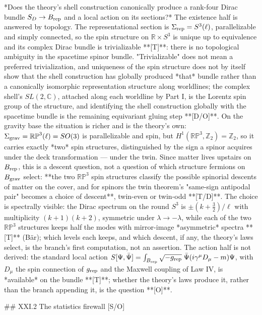 *Does the theory's shell construction canonically produce a rank-four Dirac bundle $S_D\to B_{\rm rep}$ and a local action on its sections?* The existence half is answered by topology. The representational section is $\Sigma_{\rm rep} = S^3(\ell)$, parallelizable and simply connected, so the spin structure on $\mathbb R\times S^3$ is unique up to equivalence and its complex Dirac bundle is trivializable **[T]**: there is no topological ambiguity in the spacetime spinor bundle. "Trivializable" does not mean a preferred trivialization, and uniqueness of the spin structure does not by itself show that the shell construction has globally produced *that* bundle rather than a canonically isomorphic representation structure along worldlines; the complex shell's $SL(2,\mathbb C)$, attached along each worldline by Part I, is the Lorentz spin group of the structure, and identifying the shell construction globally with the spacetime bundle is the remaining equivariant gluing step **[D/O]**. On the gravity base the situation is richer and is the theory's own: $\Sigma_{\rm grav} = \mathbb{RP}^3(\ell) = SO(3)$ is parallelizable and spin, but $H^1(\mathbb{RP}^3,\mathbb Z_2) = \mathbb Z_2$, so it carries exactly *two* spin structures, distinguished by the sign a spinor acquires under the deck transformation — under the twin. Since matter lives upstairs on $B_{\rm rep}$, this is a descent question, not a question of which structure fermions on $B_{\rm grav}$ select: **the two $\mathbb{RP}^3$ spin structures classify the possible spinorial descents of matter on the cover, and for spinors the twin theorem's "same-sign antipodal pair" becomes a choice of descent**, twin-even or twin-odd **[T/D]**. The choice is spectrally visible: the Dirac spectrum on the round $S^3$ is $\pm(k+\tfrac32)/\ell$ with multiplicity $(k+1)(k+2)$, symmetric under $\lambda\to-\lambda$, while each of the two $\mathbb{RP}^3$ structures keeps half the modes with mirror-image *asymmetric* spectra **[T]** (Bär); which levels each keeps, and which descent, if any, the theory's laws select, is the branch's first computation, not an assertion. The action half is not derived: the standard local action $S[\Psi,\bar\Psi] = \int_{B_{\rm rep} }\sqrt{-g_{\rm rep} }\;\bar\Psi(i\gamma^\mu D_\mu-m)\Psi$, with $D_\mu$ the spin connection of $g_{\rm rep}$ and the Maxwell coupling of Law IV, is *available* on the bundle **[T]**; whether the theory's laws produce it, rather than the branch appending it, is the question **[O]**.

## XXI.2 The statistics firewall [S/O]

